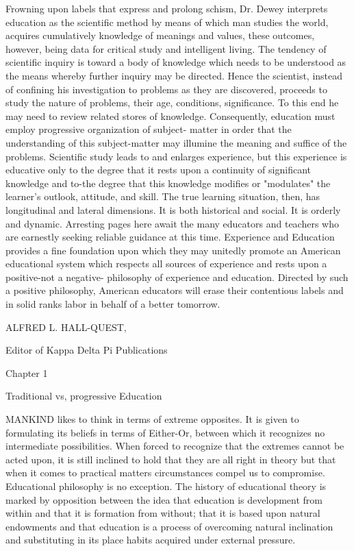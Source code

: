 Frowning upon labels that express and prolong schism, Dr. Dewey interprets 
education as the scientific method by means of which man studies the world, acquires 
cumulatively knowledge of meanings and values, these outcomes, however, being data 
for critical study and intelligent living. The tendency of scientific inquiry is toward a 
body of knowledge which needs to be understood as the means whereby further inquiry 
may be directed. Hence the scientist, instead of confining his investigation to problems as 
they are discovered, proceeds to study the nature of problems, their age, conditions, 
significance. To this end he may need to review related stores of knowledge. 
Consequently, education must employ progressive organization of subject- matter in 
order that the understanding of this subject-matter may illumine the meaning and suffice 
of the problems. Scientific study leads to and enlarges experience, but this experience is 
educative only to the degree that it rests upon a continuity of significant knowledge and 
to-the degree that this knowledge modifies or "modulates" the learner's outlook, attitude, 
and skill. The true learning situation, then, has longitudinal and lateral dimensions. It is 
both historical and social. It is orderly and dynamic. Arresting pages here await the many 
educators and teachers who are earnestly seeking reliable guidance at this time. 
Experience and Education provides a fine foundation upon which they may unitedly 
promote an American educational system which respects all sources of experience and 
rests upon a positive-not a negative- philosophy of experience and education. Directed by 
such a positive philosophy, American educators will erase their contentious labels and in 
solid ranks labor in behalf of a better tomorrow. 


ALFRED L. HALL-QUEST, 


Editor of Kappa Delta Pi Publications 


Chapter 1 


Traditional vs, progressive Education 

MANKIND likes to think in terms of extreme opposites. It is given to formulating its 
beliefs in terms of Either-Or, between which it recognizes no intermediate possibilities. 
When forced to recognize that the extremes cannot be acted upon, it is still inclined to 
hold that they are all right in theory but that when it comes to practical matters 
circumstances compel us to compromise. Educational philosophy is no exception. The 
history of educational theory is marked by opposition between the idea that education is 
development from within and that it is formation from without; that it is based upon 
natural endowments and that education is a process of overcoming natural inclination and 
substituting in its place habits acquired under external pressure. 

